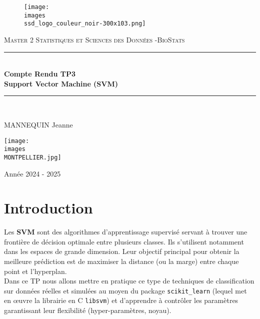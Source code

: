 \documentclass[11pt,a4paper]{article}
\author{Mannequin Jeanne}
\date{01/10/2024}
\begin{document}
\begin{titlepage}

\newcommand{\HRule}{\rule{\linewidth}{0.5mm}}
\center 


\begin{figure}
    \centering
    \texttt{[image: \\images\\ssd\_logo\_couleur\_noir-300x103.png]}
\end{figure}



\textsc{\Large Master 2 Statistiques et Sciences des Données -BioStats}\\[1cm] %
\HRule \\[0.4cm]
{ \huge \bfseries Compte Rendu TP3 \\ Support Vector Machine (SVM)}\\[0.4cm]
\HRule \\[1.5cm]
\vspace{10cm}
\begin{center}
\begin{Large}
MANNEQUIN Jeanne \\
\end{Large}
\end{center}
    

\begin{center}
\vfill{\texttt{[image: \\images\\MONTPELLIER.jpg]}\vspace{0.5cm}\\
\begin{Large} Année 2024 - 2025 \\
\end{Large}}



\end{center}

\end{titlepage}

\pagebreak

\tableofcontents
\pagebreak

\section*{Introduction}
Les \textbf{SVM} sont des algorithmes d'apprentissage supervisé servant à trouver une frontière de décision optimale entre plusieurs classes. Ils s'utilisent notamment dans les espaces de grande dimension. Leur objectif principal pour obtenir la meilleure prédiction est de maximiser la distance (ou la marge) entre chaque point et l'hyperplan. \\
Dans ce TP nous allons mettre en pratique ce type de techniques de classification sur données réelles et simulées au moyen du package \texttt{scikit\_learn} (lequel met en œuvre la librairie en C \texttt{libsvm}) et d’apprendre à contrôler les paramètres garantissant leur flexibilité (hyper-paramètres, noyau).\\
\end{document}
